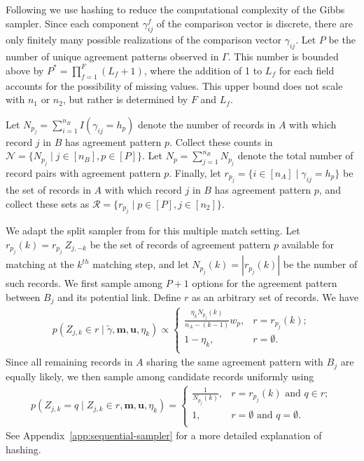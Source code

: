 \documentclass[12pt,letterpaper]{article}
\newcommand{\1}[1]{\mathbb{I}\!\left[#1\right]} %
\begin{document}
Following \cite{kundinger_2023} we use hashing to reduce the computational complexity of the Gibbs sampler. Since each component $\gamma_{ij}^f$ of the comparison vector is discrete, there are only finitely many possible realizations of the comparison vector $\gamma_{ij}$. Let $P$ be the number of unique agreement patterns observed in $\Gamma$. This number is bounded above by $P^{*} = \prod_{f=1}^F (L_f + 1)$, where the addition of 1 to $L_f$ for each field accounts for the possibility of missing values. This upper bound does not scale with $n_1$ or $n_2$, but rather is determined by $F$ and $L_f$. 

Let $N_{p_j}=\sum_{i=1}^{n_B}I(\gamma_{ij}=h_p)$ denote the number of records in $A$ with which record $j$ in $B$ has agreement pattern $p$. Collect these counts in $\mathcal{N}=\{N_{p_j}\mid j\in[n_B], p\in[P]\}.$ Let $N_p=\sum_{j=1}^{n_B}N_{p_j}$ denote the total number of record pairs with agreement pattern $p$. Finally, let $r_{p_j}=\{i\in[n_A]\mid \gamma_{ij}=h_p\}$ be the set of records in $A$ with which record $j$ in $B$ has agreement pattern $p$, and collect these sets as $\mathcal{R}=\{r_{p_j}\mid p\in[P], j\in[n_2]\}$.

We adapt the split sampler from \cite{kundinger_2023} for this multiple match setting. Let $r_{p_j}(k) = r_{p_j} \ Z_{j, -k}$ be the set of records of agreement pattern $p$ available for matching at the $k^{th}$ matching step, and let $N_{p_j}(k) = |r_{p_j}(k)|$ be the number of such records. We first sample among $P + 1$ options for the agreement pattern between $B_j$ and its potential link. Define $r$ as an arbitrary set of records. We have
\begin{align}
	\label{eqn:gibbs1}
	p\left( Z_{j, k} \in r \mid \tilde{\gamma}, \bm{m}, \bm{u}, \eta_k \right) \propto
	\begin{cases} 
		\frac{\eta_k N_{p_j}(k)}{n_A - (k - 1)}  w_{p},  & r = r_{p_j}(k); \\
		1- \eta_k , &  r = \emptyset. \\
	\end{cases}
\end{align}
Since all remaining records in $A$ sharing the same agreement pattern with $B_j$ are equally likely, we then sample among candidate records uniformly using
\begin{align}
	\label{eqn:gibbs2}
	p\left(Z_{j, k} = q \mid Z_{j, k} \in r, \bm{m}, \bm{u}, \eta_k \right) = \begin{cases} 
		\frac{1}{N_{p_j}(k)}, & r = r_{p_j}(k) \text{ and } q \in r; \\
		1, & r = \emptyset \text{ and } q = \emptyset. \\
	\end{cases}
\end{align}
See Appendix~\ref{app:sequential-sampler} for a more detailed explanation of hashing. 
\end{document}
